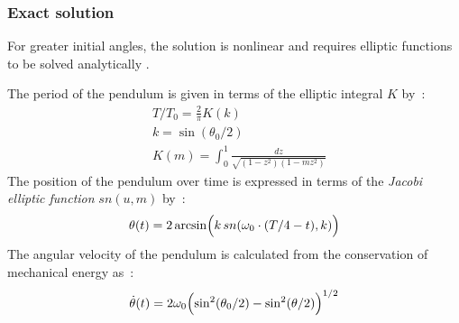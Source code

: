 \subsubsection{Exact solution}
For greater initial angles, the solution is nonlinear and requires elliptic functions to be solved analytically \cite{Borghi2013,Belendez2007}.

The period of the pendulum is given in terms of the elliptic integral $K$ by~:
\begin{subequations}
\begin{alignat}{5}
	&T / T_0  = \frac{2}{\pi}K(k)
	\\[0.5em]
	& k = \sin (\theta_0 / 2)
	\\[0.5em]
	&K(m) = \int_0^1 \frac{dz}{\sqrt{(1-z^2)(1-mz^2)}}
\end{alignat}
\end{subequations}
The position of the pendulum over time is expressed in terms of the \emph{Jacobi elliptic function} $sn(u,m)$ by~:
\begin{equation}
	\theta(t) = 2 \arcsin \Bigl( k \,sn(\omega_0\cdot(T/4 - t), k) \Bigr)
\end{equation}
The angular velocity of the pendulum is calculated from the conservation of mechanical energy as~:
\begin{equation}
	\dot{\theta}(t) = 2 \omega_0 \Bigl( \sin^2 (\theta_0/2) - \sin^2 (\theta/2) \Bigr)^{1/2}
\end{equation}

